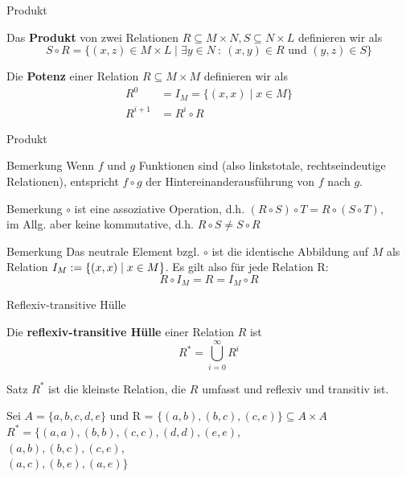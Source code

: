 \begin{frame}{Produkt}
	\begin{Definition}
		Das \textbf{Produkt} von zwei Relationen $R \subseteq M \times N, S \subseteq N \times L$ definieren wir als $$S \circ R = \{(x,z) \in M \times L \mid \exists y \in N \ : \ (x,y) \in R \text{ und } (y,z) \in S \}$$
	\end{Definition}	
	\pause
	
	\begin{Definition}
		Die \textbf{Potenz} einer Relation $R \subseteq M \times M$ definieren wir als
		\begin{align*}
			R^0 &= I_M = \{(x,x) \mid x \in M \} \\
			R^{i+1} &= R^i \circ R
		\end{align*}
	\end{Definition}
\end{frame}

\begin{frame}{Produkt}
	\begin{exampleblock}{Bemerkung}
		Wenn $f$ und $g$ Funktionen sind (also linkstotale, rechtseindeutige Relationen), entspricht $f \circ g$ der Hintereinanderausführung von $f$ nach $g$.
	\end{exampleblock}

	\begin{exampleblock}{Bemerkung}
		$\circ$ ist eine assoziative Operation, d.h. $(R \circ S) \circ T = R \circ (S \circ T)$,\\
		im Allg. aber keine kommutative, d.h. $R \circ S \neq S \circ R$
	\end{exampleblock}

	\begin{exampleblock}{Bemerkung}
		Das neutrale Element bzgl. $\circ$ ist die identische Abbildung auf $M$ als Relation $I_M := \left\{ (x,x) \mid x \in M \right\}$. Es gilt also für jede Relation R:
		\[
			R \circ I_M = R = I_M \circ R
		\]
	\end{exampleblock}

	
\end{frame}

\begin{frame}{Reflexiv-transitive Hülle}
	\begin{Definition}
		Die \textbf{reflexiv-transitive Hülle} einer Relation $R$ ist
		$$R^\ast = \bigcup \limits_{i=0}^\infty R^i$$
	\end{Definition}

	\pause
	\begin{block}{Satz}
		$R^*$ ist die kleinste Relation, die $R$ umfasst und reflexiv und
		transitiv ist.
	\end{block}

	\pause
	\begin{Beispiel}
		Sei $A = \{a, b, c, d, e\}$ und R = $\{(a, b), (b, c), (c, e)\} \subseteq A \times A$\\ \pause
		$R^*=\{(a,a), (b,b), (c,c), (d,d), (e,e),$ \\
		$(a,b), (b,c), (c,e),$ \\
		$(a,c), (b,e),(a,e)\}$
	\end{Beispiel}
	
\end{frame}

